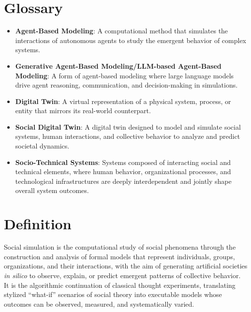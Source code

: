 \documentclass[11pt]{article}
\begin{document}
\section*{Glossary}
\begin{itemize}
    \item \textbf{Agent-Based Modeling}: A computational method that simulates the interactions of autonomous agents to study the emergent behavior of complex systems.
    
    \item \textbf{Generative Agent-Based Modeling/LLM-based Agent-Based Modeling}: A form of agent-based modeling where large language models drive agent reasoning, communication, and decision-making in simulations.

    \item \textbf{Digital Twin}: A virtual representation of a physical system, process, or entity that mirrors its real-world counterpart.

    \item \textbf{Social Digital Twin}: A digital twin designed to model and simulate social systems, human interactions, and collective behavior to analyze and predict societal dynamics.


    \item \textbf{Socio-Technical Systems}: Systems composed of interacting social and technical elements, where human behavior, organizational processes, and technological infrastructures are deeply interdependent and jointly shape overall system outcomes.

\end{itemize}




\section{Definition}
\label{sec:definition}
Social simulation is the computational study of social phenomena through the construction and analysis of formal models that represent individuals, groups, organizations, and their interactions, with the aim of generating artificial societies \textit{in silico} to observe, explain, or predict emergent patterns of collective behavior. It is the algorithmic continuation of classical thought experiments, translating stylized “what-if” scenarios of social theory into executable models whose outcomes can be observed, measured, and systematically varied.
\end{document}
